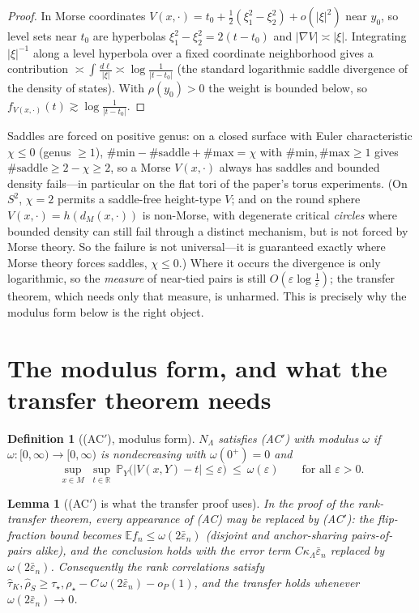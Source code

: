 \documentclass[11pt]{article}
\newtheorem{lemma}[theorem]{Lemma}
\newtheorem{definition}[theorem]{Definition}
\theoremstyle{remark}
\newcommand{\dM}{d_M}
\newcommand{\NL}{N_\Lambda}
\begin{document}
\begin{proof}
In Morse coordinates $V(x,\cdot)=t_0+\tfrac12(\xi_1^2-\xi_2^2)+o(\lvert\xi\rvert^2)$ near
$y_0$, so level sets near $t_0$ are hyperbolas $\xi_1^2-\xi_2^2=2(t-t_0)$ and
$\lvert\nabla V\rvert\asymp\lvert\xi\rvert$. Integrating $\lvert\xi\rvert^{-1}$ along a
level hyperbola over a fixed coordinate neighborhood gives a contribution
$\asymp\int^{}\!\frac{d\ell}{\lvert\xi\rvert}\asymp\log\frac1{\lvert t-t_0\rvert}$ (the
standard logarithmic saddle divergence of the density of states). With $\rho(y_0)>0$ the
weight is bounded below, so $f_{V(x,\cdot)}(t)\gtrsim\log\frac1{\lvert t-t_0\rvert}$.
\end{proof}

Saddles are forced on positive genus: on a closed surface with Euler characteristic
$\chi\le0$ (genus $\ge1$), $\#\mathrm{min}-\#\mathrm{saddle}+\#\mathrm{max}=\chi$ with
$\#\mathrm{min},\#\mathrm{max}\ge1$ gives $\#\mathrm{saddle}\ge2-\chi\ge2$, so a Morse
$V(x,\cdot)$ always has saddles and bounded density fails---in particular on the flat tori
of the paper's torus experiments. (On $S^2$, $\chi=2$ permits a saddle-free height-type
$V$; and on the round sphere $V(x,\cdot)=h(\dM(x,\cdot))$ is non-Morse, with degenerate
critical \emph{circles} where bounded density can still fail through a distinct mechanism,
but is not forced by Morse theory. So the failure is not universal---it is guaranteed
exactly where Morse theory forces saddles, $\chi\le0$.) Where it occurs the divergence is
only logarithmic, so the \emph{measure} of near-tied pairs is still
$O(\varepsilon\log\frac1\varepsilon)$; the transfer theorem, which needs only that measure,
is unharmed. This is precisely why the modulus form below is the right object.

\section{The modulus form, and what the transfer theorem needs}

\begin{definition}[(AC$'$), modulus form]
$\NL$ satisfies \emph{(AC$'$)} with modulus $\omega$ if $\omega:[0,\infty)\to[0,\infty)$
is nondecreasing with $\omega(0^+)=0$ and
\[
\sup_{x\in M}\ \sup_{t\in\mathbb R}\ \mathbb P_Y\bigl(\lvert V(x,Y)-t\rvert\le\varepsilon\bigr)\ \le\ \omega(\varepsilon)
\qquad\text{for all }\varepsilon>0 .
\]
\end{definition}

\begin{lemma}[(AC$'$) is what the transfer proof uses]\label{lem:acprime}
In the proof of the rank-transfer theorem, every appearance of (AC) may be replaced by
(AC$'$): the flip-fraction bound becomes $\mathbb E f_n\le\omega(2\bar\varepsilon_n)$
(disjoint and anchor-sharing pairs-of-pairs alike), and the conclusion holds with the
error term $C\kappa_\Lambda\bar\varepsilon_n$ replaced by $\omega(2\bar\varepsilon_n)$.
Consequently the rank correlations satisfy
$\widehat\tau_K,\widehat\rho_S\ge\tau_\star,\rho_\star-C\,\omega(2\bar\varepsilon_n)-o_P(1)$,
and the transfer holds whenever $\omega(2\bar\varepsilon_n)\to0$.
\end{lemma}
\end{document}
